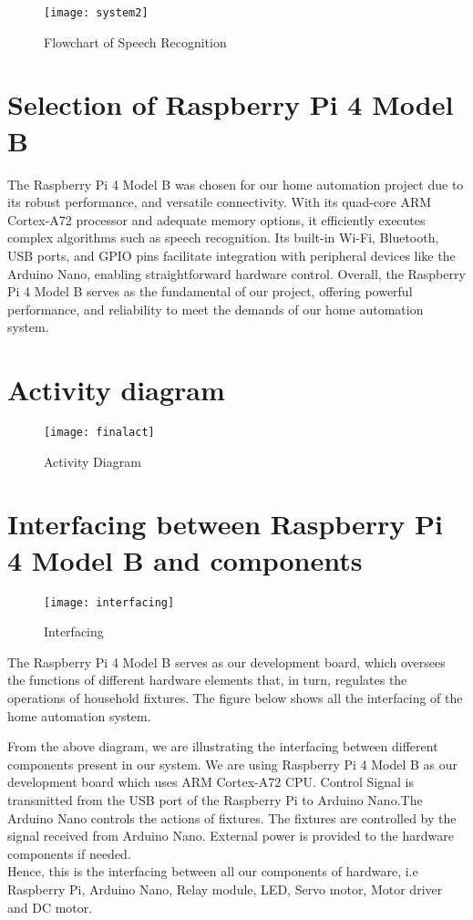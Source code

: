         \begin{figure}[h]
            \centering
            \texttt{[image: system2]}
            \caption{Flowchart of Speech Recognition}
            \label{fig:system2}
        \end{figure}
            
       \section{Selection of Raspberry Pi 4 Model B}
       The Raspberry Pi 4 Model B was chosen for our home automation project due to its robust performance, and versatile connectivity. With its quad-core ARM Cortex-A72 processor and adequate memory options, it efficiently executes complex algorithms such as speech recognition. Its built-in Wi-Fi, Bluetooth, USB ports, and GPIO pins facilitate integration with peripheral devices like the Arduino Nano, enabling straightforward hardware control. Overall, the Raspberry Pi 4 Model B serves as the fundamental of our project, offering powerful performance, and reliability to meet the demands of our home automation system.
\newpage
        \section{Activity diagram}
        \begin{figure}[htbp] 
            \centering
            \texttt{[image: finalact]}
            \caption{Activity Diagram}
            \label{fig:Activity}
        \end{figure}
\newpage

        \section{Interfacing between Raspberry Pi 4 Model B and components}
        \begin{figure}[h]
            \centering
            \texttt{[image: interfacing]}
            \caption{Interfacing}
            \label{fig:interface}
        \end{figure}
        The Raspberry Pi 4 Model B serves as our development board, which oversees the functions of different hardware elements that, in turn, regulates  the operations of household fixtures. The figure below shows all the interfacing of the home automation system.

        
        From the above diagram, we are illustrating the interfacing between different components present in our system. We are using Raspberry Pi 4 Model B as our development board which uses ARM Cortex-A72 CPU. Control Signal is transmitted from the USB port of the Raspberry Pi to Arduino Nano.The Arduino Nano controls the actions of fixtures. The fixtures are controlled by the signal received from Arduino Nano. External power is provided to the hardware components if needed.\\
        Hence, this is the interfacing between all our components of hardware, i.e Raspberry Pi, Arduino Nano, Relay module, LED, Servo motor, Motor driver and DC motor.

